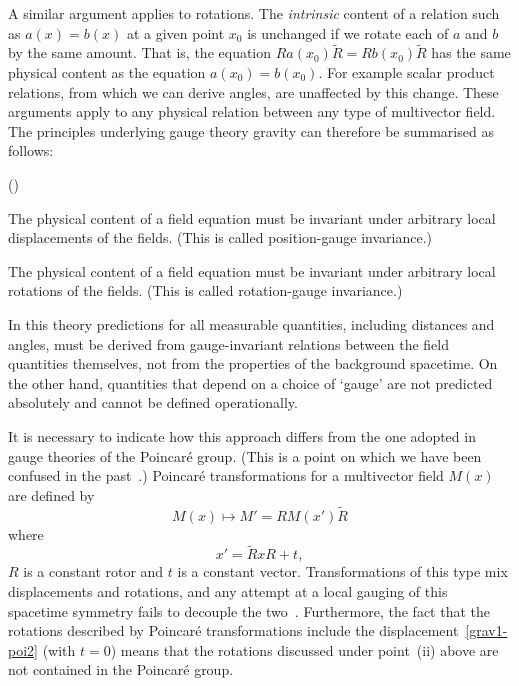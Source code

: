\documentclass[a4paper]{article}
\numberwithin{equation}{section}
\newcommand{\Rrev}{\tilde{R}}
\newcounter{bean}
\newenvironment{romanlist}%
{\begin{list}%
{(\roman{bean})}{\topsep 0in \usecounter{bean}}}%
{\end{list}}
\begin{document}
A similar argument applies to rotations.  The \textit{intrinsic}
content of a relation such as $a(x)=b(x)$ at a given point $x_0$ is
unchanged if we rotate each of $a$ and $b$ by the same amount.  That
is, the equation $Ra(x_0)\Rrev=Rb(x_0)\Rrev$ has the same physical
content as the equation $a(x_0)=b(x_0)$.  For example scalar product
relations, from which we can derive angles, are unaffected by this
change.  These arguments apply to any physical relation between any
type of multivector field.  The principles underlying gauge theory
gravity can therefore be summarised as follows:

\begin{romanlist}
\setcounter{bean}{0}
\item The physical content of a field equation must be invariant under
arbitrary local displacements of the fields. (This is called
position-gauge invariance.)
\item The physical content of a field equation must be invariant under
arbitrary local rotations of the fields.  (This is called
rotation-gauge invariance.)
\end{romanlist}


In this theory predictions for all measurable quantities, including
distances and angles, must be derived from gauge-invariant relations
between the field quantities themselves, not from the properties of
the background spacetime.  On the other hand, quantities that depend
on a choice of `gauge' are not predicted absolutely and cannot be
defined operationally.


It is necessary to indicate how this approach differs from the one
adopted in gauge theories of the Poincar\'{e} group.  (This is a point
on which we have been confused in the past~\cite{DGL-grav-bel}.)
Poincar\'{e} transformations for a multivector field $M(x)$ are
defined by
%
\begin{equation}
M(x) \mapsto M' = R M(x') \Rrev
\label{grav1-poi1}
\end{equation}
%
where
%
\begin{equation}
x' = \Rrev x R + t,
\label{grav1-poi2}
\end{equation} 
%
$R$ is a constant rotor and $t$ is a constant vector.  Transformations
of this type mix displacements and rotations, and any attempt at a
local gauging of this spacetime symmetry fails to decouple the
two~\cite{kib61,heh76}.  Furthermore, the fact that the rotations
described by Poincar\'{e} transformations include the
displacement~\eqref{grav1-poi2} (with $t=0$) means that the rotations
discussed under point~(ii) above are not contained in the Poincar\'{e}
group.
\end{document}
